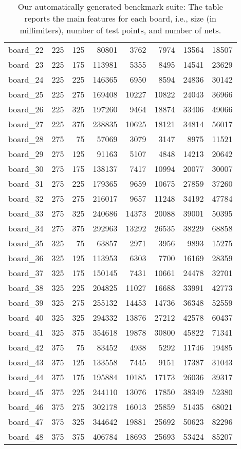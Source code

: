 \begin{table*}[!htb]
\begin{center}
\begin{tabular}{|l|rr|rr|rrr|}
board\_22 & 225 & 125 & 80801 & 3762 & 7974 & 13564 & 18507 \\
board\_23 & 225 & 175 & 113981 & 5355 & 8495 & 14541 & 23629 \\
board\_24 & 225 & 225 & 146365 & 6950 & 8594 & 24836 & 30142 \\
board\_25 & 225 & 275 & 169408 & 10227 & 10822 & 24043 & 36966 \\
board\_26 & 225 & 325 & 197260 & 9464 & 18874 & 33406 & 49066 \\
board\_27 & 225 & 375 & 238835 & 10625 & 18121 & 34814 & 56017 \\
board\_28 & 275 & 75 & 57069 & 3079 & 3147 & 8975 & 11521 \\
board\_29 & 275 & 125 & 91163 & 5107 & 4848 & 14213 & 20642 \\
board\_30 & 275 & 175 & 138137 & 7417 & 10994 & 20077 & 30007 \\
board\_31 & 275 & 225 & 179365 & 9659 & 10675 & 27859 & 37260 \\
board\_32 & 275 & 275 & 216017 & 9657 & 11248 & 34192 & 47784 \\
board\_33 & 275 & 325 & 240686 & 14373 & 20088 & 39001 & 50395 \\
board\_34 & 275 & 375 & 292963 & 13292 & 26535 & 38229 & 68858 \\
board\_35 & 325 & 75 & 63857 & 2971 & 3956 & 9893 & 15275 \\
board\_36 & 325 & 125 & 113953 & 6303 & 7700 & 16169 & 28359 \\
board\_37 & 325 & 175 & 150145 & 7431 & 10661 & 24478 & 32701 \\
board\_38 & 325 & 225 & 204825 & 11027 & 16688 & 33991 & 42773 \\
board\_39 & 325 & 275 & 255132 & 14453 & 14736 & 36348 & 52559 \\
board\_40 & 325 & 325 & 294332 & 13876 & 27212 & 42578 & 60437 \\
board\_41 & 325 & 375 & 354618 & 19878 & 30800 & 45822 & 71341 \\
board\_42 & 375 & 75 & 83452 & 4938 & 5292 & 11746 & 19485 \\
board\_43 & 375 & 125 & 133558 & 7445 & 9151 & 17387 & 31043 \\
board\_44 & 375 & 175 & 195884 & 10185 & 17173 & 26036 & 39317 \\
board\_45 & 375 & 225 & 244110 & 13076 & 17850 & 38349 & 52380 \\
board\_46 & 375 & 275 & 302178 & 16013 & 25859 & 51435 & 68021 \\
board\_47 & 375 & 325 & 344642 & 19881 & 25692 & 50623 & 82296 \\
board\_48 & 375 & 375 & 406784 & 18693 & 25693 & 53424 & 85207 \\
\hline
\end{tabular}
\caption{
 \label{tab:benchmark}
 Our automatically generated benckmark suite: The table reports the main features for each board, i.e., size (in millimiters), number of test points, and number of nets.
}
\end{center}
\end{table*}

